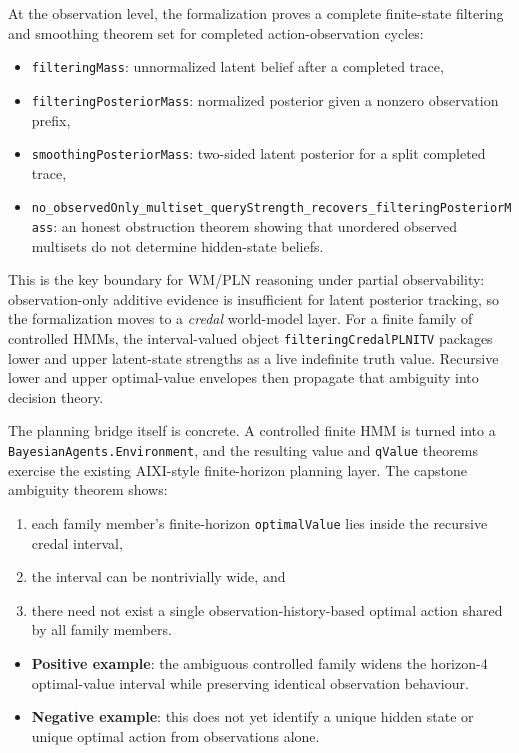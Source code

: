 \documentclass[11pt,a4paper]{article}
\theoremstyle{definition}
\begin{document}
At the observation level, the formalization proves a complete finite-state
filtering and smoothing theorem set for completed action-observation cycles:
\begin{itemize}
\item \texttt{filteringMass}: unnormalized latent belief after a completed trace,
\item \texttt{filteringPosteriorMass}: normalized posterior given a nonzero
  observation prefix,
\item \texttt{smoothingPosteriorMass}: two-sided latent posterior for a split
  completed trace,
\item \texttt{no\_observedOnly\_multiset\_queryStrength\_recovers\_filteringPosteriorMass}:
  an honest obstruction theorem showing that unordered observed multisets do not
  determine hidden-state beliefs.
\end{itemize}

This is the key boundary for WM/PLN reasoning under partial observability:
observation-only additive evidence is insufficient for latent posterior
tracking, so the formalization moves to a \emph{credal} world-model layer.
For a finite family of controlled HMMs, the interval-valued object
\texttt{filteringCredalPLNITV} packages lower and upper latent-state strengths
as a live indefinite truth value.  Recursive lower and upper optimal-value
envelopes then propagate that ambiguity into decision theory.

The planning bridge itself is concrete.  A controlled finite HMM is turned into
a \texttt{BayesianAgents.Environment}, and the resulting value and
\texttt{qValue} theorems exercise the existing AIXI-style finite-horizon
planning layer.  The capstone ambiguity theorem shows:
\begin{enumerate}
\item each family member's finite-horizon \texttt{optimalValue} lies inside the
  recursive credal interval,
\item the interval can be nontrivially wide, and
\item there need not exist a single observation-history-based optimal action
  shared by all family members.
\end{enumerate}

\begin{itemize}
\item \textbf{Positive example}: the ambiguous controlled family widens the
  horizon-4 optimal-value interval while preserving identical observation
  behaviour.
\item \textbf{Negative example}: this does not yet identify a unique hidden
  state or unique optimal action from observations alone.
\end{itemize}
\end{document}

